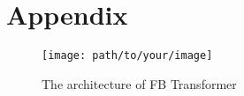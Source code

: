 \documentclass[11pt]{article}
\begin{document}




\appendix

\section{Appendix}

\begin{figure}[h]
  \centering
  \texttt{[image: path/to/your/image]}
  \caption{The architecture of FB Transformer}
  \label{fig:fb_transformer}
  \end{figure}

\end{document}
